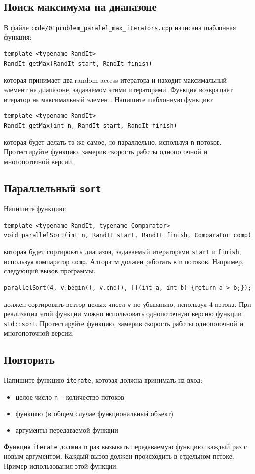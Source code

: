 \documentclass{article}
\begin{document}
\subsection{Поиск максимума на диапазоне}
В файле \texttt{code/01problem\_paralel\_max\_iterators.cpp} написана шаблонная функция:
\begin{lstlisting}
template <typename RandIt>
RandIt getMax(RandIt start, RandIt finish)
\end{lstlisting}
которая принимает два random-access итератора и находит максимальный элемент на диапазоне, задаваемом этими итераторами. Функция возвращает итератор на максимальный элемент.
Напишите шаблонную функцию:
\begin{lstlisting}
template <typename RandIt>
RandIt getMax(int n, RandIt start, RandIt finish)
\end{lstlisting}
которая будет делать то же самое, но параллельно, используя \texttt{n} потоков.
Протестируйте функцию, замерив скорость работы однопоточной и многопоточной версии.

\subsection{Параллельный \texttt{sort}}
Напишите функцию:
\begin{lstlisting}
template <typename RandIt, typename Comparator>
void parallelSort(int n, RandIt start, RandIt finish, Comparator comp)
\end{lstlisting}
которая будет сортировать диапазон, задаваемый итераторами \texttt{start} и \texttt{finish}, используя компаратор \texttt{comp}.
Алгоритм должен работать в \texttt{n} потоков.
Например, следующий вызов программы:
\begin{lstlisting}
parallelSort(4, v.begin(), v.end(), [](int a, int b) {return a > b;});
\end{lstlisting}
должен сортировать вектор целых чисел \texttt{v} по убыванию, используя 4 потока.
При реализации этой функции можно использовать однопоточную версию функции \texttt{std::sort}.
Протестируйте функцию, замерив скорость работы однопоточной и многопоточной версии.

\subsection{Повторить}
Напишите функцию \texttt{iterate}, которая должна принимать на вход:
\begin{itemize}
\item целое число \texttt{n} -- количество потоков
\item функцию (в общем случае функциональный объект)
\item аргументы передаваемой функции
\end{itemize}
Функция \texttt{iterate} должна \texttt{n} раз вызывать передаваемую функцию, каждый раз с новым аргументом. Каждый вызов должен происходить в отдельном потоке. Пример использования этой функции:
\end{document}

